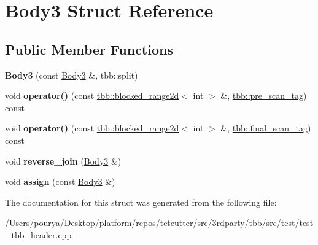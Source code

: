 \hypertarget{structBody3}{}\section{Body3 Struct Reference}
\label{structBody3}
\subsection*{Public Member Functions}
\begin{DoxyCompactItemize}
\item 
\hypertarget{structBody3_add7086e43687a21df3757cd54a28af90}{}{\bfseries Body3} (const \hyperlink{structBody3}{Body3} \&, tbb\+::split)\label{structBody3_add7086e43687a21df3757cd54a28af90}

\item 
\hypertarget{structBody3_a315f043507854f4b21b1111bdbbd6351}{}void {\bfseries operator()} (const \hyperlink{classtbb_1_1blocked__range2d}{tbb\+::blocked\+\_\+range2d}$<$ int $>$ \&, \hyperlink{structtbb_1_1pre__scan__tag}{tbb\+::pre\+\_\+scan\+\_\+tag}) const \label{structBody3_a315f043507854f4b21b1111bdbbd6351}

\item 
\hypertarget{structBody3_aa7f8b4a496656549e2c96d9c789409cf}{}void {\bfseries operator()} (const \hyperlink{classtbb_1_1blocked__range2d}{tbb\+::blocked\+\_\+range2d}$<$ int $>$ \&, \hyperlink{structtbb_1_1final__scan__tag}{tbb\+::final\+\_\+scan\+\_\+tag}) const \label{structBody3_aa7f8b4a496656549e2c96d9c789409cf}

\item 
\hypertarget{structBody3_ab8b5a80a1731fdb8c294eda7605793a2}{}void {\bfseries reverse\+\_\+join} (\hyperlink{structBody3}{Body3} \&)\label{structBody3_ab8b5a80a1731fdb8c294eda7605793a2}

\item 
\hypertarget{structBody3_a997529d4f84da296a361a5e2af6c3ce4}{}void {\bfseries assign} (const \hyperlink{structBody3}{Body3} \&)\label{structBody3_a997529d4f84da296a361a5e2af6c3ce4}

\end{DoxyCompactItemize}


The documentation for this struct was generated from the following file\+:\begin{DoxyCompactItemize}
\item 
/\+Users/pourya/\+Desktop/platform/repos/tetcutter/src/3rdparty/tbb/src/test/test\+\_\+tbb\+\_\+header.\+cpp\end{DoxyCompactItemize}
